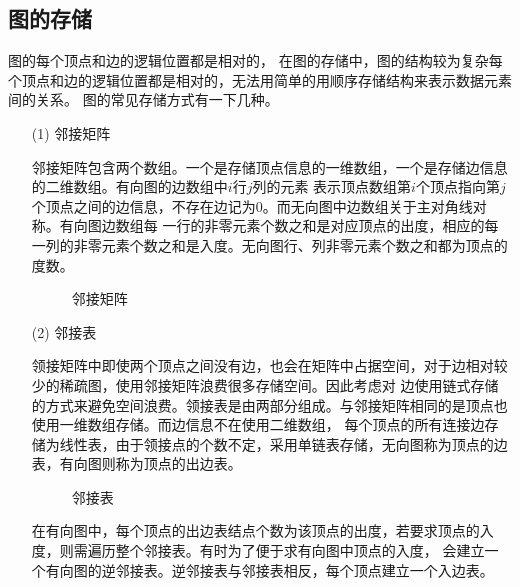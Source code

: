 \documentclass[master]{thesis-uestc}
\begin{document}
\subsection{图的存储}
\label{subsec:graph-storage}
    图的每个顶点和边的逻辑位置都是相对的，
    在图的存储中，图的结构较为复杂每个顶点和边的逻辑位置都是相对的，无法用简单的用顺序存储结构来表示数据元素间的关系。
图的常见存储方式有一下几种。
\begin{enumerate}
    \item[(1)] 邻接矩阵
    
        邻接矩阵包含两个数组。一个是存储顶点信息的一维数组，一个是存储边信息的二维数组。有向图的边数组中$i$行$j$列的元素
    表示顶点数组第$i$个顶点指向第$j$个顶点之间的边信息，不存在边记为0。而无向图中边数组关于主对角线对称。有向图边数组每
    一行的非零元素个数之和是对应顶点的出度，相应的每一列的非零元素个数之和是入度。无向图行、列非零元素个数之和都为顶点的度数。
    \begin{figure}[h]
        \caption{邻接矩阵}
        \label{fig:adj_mart}
    \end{figure}
    \item[(2)] 邻接表
    
        领接矩阵中即使两个顶点之间没有边，也会在矩阵中占据空间，对于边相对较少的稀疏图，使用邻接矩阵浪费很多存储空间。因此考虑对
    边使用链式存储的方式来避免空间浪费。领接表是由两部分组成。与邻接矩阵相同的是顶点也使用一维数组存储。而边信息不在使用二维数组，
    每个顶点的所有连接边存储为线性表，由于领接点的个数不定，采用单链表存储，无向图称为顶点的边表，有向图则称为顶点的出边表。

    \begin{figure}[h]
        \caption{邻接表}
        \label{fig:adj_list}
    \end{figure}
        
        在有向图中，每个顶点的出边表结点个数为该顶点的出度，若要求顶点的入度，则需遍历整个邻接表。有时为了便于求有向图中顶点的入度，
    会建立一个有向图的逆邻接表。逆邻接表与邻接表相反，每个顶点建立一个入边表。
    

\end{enumerate}
\end{document}
